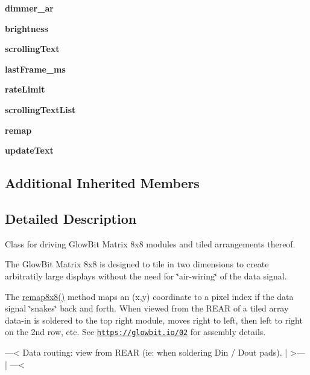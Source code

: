 \begin{DoxyCompactItemize}
{\bfseries dimmer\+\_\+ar}
\item 
\mbox{\label{classglowbit_1_1matrix8x8_a4d227ae72c97ff008677711fc3274104}} 
{\bfseries brightness}
\item 
\mbox{\label{classglowbit_1_1matrix8x8_abaee6a53b3a15537cb75133abc6edb22}} 
{\bfseries scrolling\+Text}
\item 
\mbox{\label{classglowbit_1_1matrix8x8_a9f9e4c792c4420744234f8c400f1dc54}} 
{\bfseries last\+Frame\+\_\+ms}
\item 
\mbox{\label{classglowbit_1_1matrix8x8_a04e1bdcc67b521246610c68f5dafaa3e}} 
{\bfseries rate\+Limit}
\item 
\mbox{\label{classglowbit_1_1matrix8x8_af0afcefd1ec2dc8614e5f8f7478fd36c}} 
{\bfseries scrolling\+Text\+List}
\item 
\mbox{\label{classglowbit_1_1matrix8x8_a458b71109effe56dcbb6cde442cf5657}} 
{\bfseries remap}
\item 
\mbox{\label{classglowbit_1_1matrix8x8_aad3eb346cc87f36b36eb8bc6aeb67e5f}} 
{\bfseries update\+Text}
\end{DoxyCompactItemize}
\subsection*{Additional Inherited Members}


\subsection{Detailed Description}
Class for driving Glow\+Bit Matrix 8x8 modules and tiled arrangements thereof. 

The Glow\+Bit Matrix 8x8 is designed to tile in two dimensions to create arbitratily large displays without the need for \char`\"{}air-\/wiring\char`\"{} of the data signal.

The \hyperlink{classglowbit_1_1matrix8x8_a67146ad236571bf9e87fe7a847c8a1d1}{remap8x8()} method maps an (x,y) coordinate to a pixel index if the data signal \char`\"{}snakes\char`\"{} back and forth. When viewed from the R\+E\+AR of a tiled array data-\/in is soldered to the top right module, moves right to left, then left to right on the 2nd row, etc. See \href{https://glowbit.io/02}{\tt https\+://glowbit.\+io/02} for assembly details. \begin{DoxyVerb}  ---<  Data routing: view from REAR (ie: when soldering Din / Dout pads).
 |
  >---
     |
  ---<\end{DoxyVerb}
 

